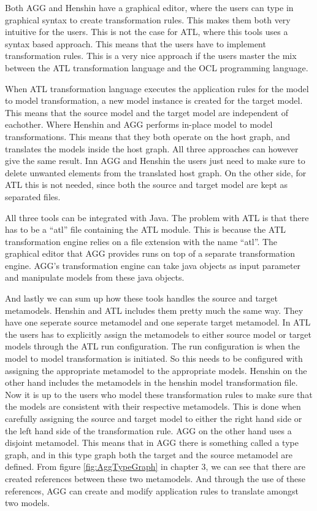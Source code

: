 \documentclass[pdftex,11pt,a4paper]{article}
\begin{document}
Both AGG and Henshin have a graphical editor, where the users can type in
graphical syntax to create transformation rules. This makes them both very
intuitive for the users. This is not the case for ATL, where this tools uses a
syntax based approach. This means that the users have to implement
transformation rules. This is a very nice approach if the users master the mix
between the ATL transformation language and the OCL programming language.

When ATL transformation language executes the application rules for the model to
model transformation, a new model instance is created for the target model. This
means that the source model and the target model are independent of eachother.
Where Henshin and AGG performs in-place model to model transformations. This
means that they both operate on the host graph, and translates the models inside
the host graph. All three approaches can however give the same result. Inn AGG
and Henshin the users just need to make sure to delete unwanted elements from the
translated host graph. On the other side, for ATL this is not needed, since both
the source and target model are kept as separated files. 

All three tools can be integrated with Java. The problem with ATL is that there
has to be a ``atl'' file containing the ATL module. This is because the ATL
transformation engine relies on a file extension with the name ``atl''. The
graphical editor that AGG provides runs on top of a separate transformation
engine. AGG's transformation engine can take java objects as input parameter and
manipulate models from these java objects.

And lastly we can sum up how these tools handles the source and target
metamodels. Henshin and ATL includes them pretty much the same way. They have
one seperate source metamodel and one seperate target metamodel. In ATL the
users has to explicitly assign the metamodels to either source model or target
models through the ATL run configuration. The run configuration is when the
model to model transformation is initiated. So this needs to be configured with
assigning the appropriate metamodel to the appropriate models. Henshin on the
other hand includes the metamodels in the henshin model transformation file. Now
it is up to the users who model these transformation rules to make sure that the
models are consistent with their respective metamodels. This is done when
carefully assigning the source and target model to either the right hand side or
the left hand side of the transformation rule. AGG on the other hand uses a
disjoint metamodel. This means that in AGG there is something called a type
graph, and in this type graph both the target and the source metamodel are
defined. From figure \ref{fig:AggTypeGraph} in chapter 3, we can see that there
are created references between these two metamodels. And through the use of
these references, AGG can create and modify application rules to translate
amongst two models.

\noindent 

 

\end{document}
